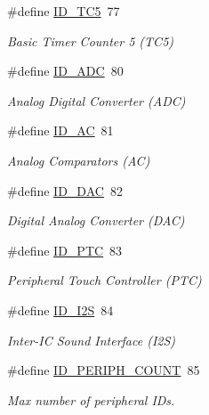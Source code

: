\begin{DoxyCompactItemize}
\#define \mbox{\hyperlink{group___s_a_m_d21_e15_b__id_ga60408f0e4285fc6e0e837aad86b862f8}{I\+D\+\_\+\+T\+C5}}~77
\begin{DoxyCompactList}\small\item\em Basic Timer Counter 5 (T\+C5) \end{DoxyCompactList}\item 
\#define \mbox{\hyperlink{group___s_a_m_d21_e15_b__id_gafb7efa537d1d64419483b97f642009fd}{I\+D\+\_\+\+A\+DC}}~80
\begin{DoxyCompactList}\small\item\em Analog Digital Converter (A\+DC) \end{DoxyCompactList}\item 
\#define \mbox{\hyperlink{group___s_a_m_d21_e15_b__id_ga20fe08f8d0b2a4e6c0dbb2371aacadb0}{I\+D\+\_\+\+AC}}~81
\begin{DoxyCompactList}\small\item\em Analog Comparators (AC) \end{DoxyCompactList}\item 
\#define \mbox{\hyperlink{group___s_a_m_d21_e15_b__id_ga2561118247335c13b56f7a79a17fceff}{I\+D\+\_\+\+D\+AC}}~82
\begin{DoxyCompactList}\small\item\em Digital Analog Converter (D\+AC) \end{DoxyCompactList}\item 
\#define \mbox{\hyperlink{group___s_a_m_d21_e15_b__id_ga6ce249818b3ff70438a4eff92e49d38e}{I\+D\+\_\+\+P\+TC}}~83
\begin{DoxyCompactList}\small\item\em Peripheral Touch Controller (P\+TC) \end{DoxyCompactList}\item 
\#define \mbox{\hyperlink{group___s_a_m_d21_e15_b__id_gac57cc3843ee128de44e5f43b5a272357}{I\+D\+\_\+\+I2S}}~84
\begin{DoxyCompactList}\small\item\em Inter-\/\+IC Sound Interface (I2S) \end{DoxyCompactList}\item 
\#define \mbox{\hyperlink{group___s_a_m_d21_e15_b__id_gad0762589e782b5eca161d9d344306da7}{I\+D\+\_\+\+P\+E\+R\+I\+P\+H\+\_\+\+C\+O\+U\+NT}}~85
\begin{DoxyCompactList}\small\item\em Max number of peripheral I\+Ds. \end{DoxyCompactList}\end{DoxyCompactItemize}


